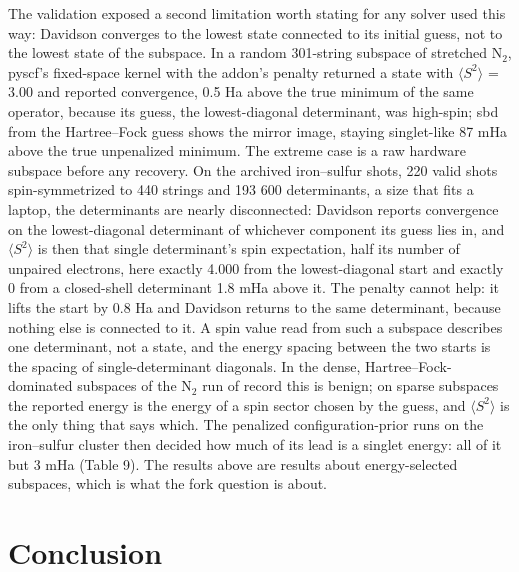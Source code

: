 \documentclass[11pt]{article}
\begin{document}
The validation exposed a second limitation worth stating for any solver used this way: Davidson converges to the lowest state connected to its initial guess, not to the lowest state of the subspace. In a random 301-string subspace of stretched N$_2$, pyscf's fixed-space kernel with the addon's penalty returned a state with $\langle S^{2}\rangle$ = 3.00 and reported convergence, 0.5 Ha above the true minimum of the same operator, because its guess, the lowest-diagonal determinant, was high-spin; sbd from the Hartree--Fock guess shows the mirror image, staying singlet-like 87 mHa above the true unpenalized minimum. The extreme case is a raw hardware subspace before any recovery. On the archived iron--sulfur shots, 220 valid shots spin-symmetrized to 440 strings and 193 600 determinants, a size that fits a laptop, the determinants are nearly disconnected: Davidson reports convergence on the lowest-diagonal determinant of whichever component its guess lies in, and $\langle S^{2}\rangle$ is then that single determinant's spin expectation, half its number of unpaired electrons, here exactly 4.000 from the lowest-diagonal start and exactly 0 from a closed-shell determinant 1.8 mHa above it. The penalty cannot help: it lifts the start by 0.8 Ha and Davidson returns to the same determinant, because nothing else is connected to it. A spin value read from such a subspace describes one determinant, not a state, and the energy spacing between the two starts is the spacing of single-determinant diagonals. In the dense, Hartree--Fock-dominated subspaces of the N$_2$ run of record this is benign; on sparse subspaces the reported energy is the energy of a spin sector chosen by the guess, and $\langle S^{2}\rangle$ is the only thing that says which. The penalized configuration-prior runs on the iron--sulfur cluster then decided how much of its lead is a singlet energy: all of it but 3 mHa (Table 9). The results above are results about energy-selected subspaces, which is what the fork question is about.


\section{Conclusion}\label{sec:4}
\end{document}
